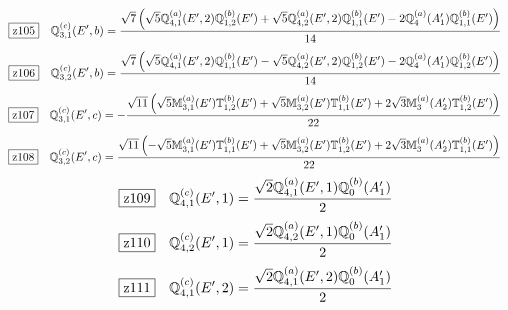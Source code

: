 \documentclass[fleqn,10pt,landscape]{jsarticle}
\begin{document}
\begin{dmath*}
\hspace*{3mm}\fbox{z105}\quad \mathbb{Q}_{3,1}^{(c)}(E^{\prime},b)=\frac{\sqrt{7} \left(\sqrt{5} \mathbb{Q}_{4,1}^{(a)}(E^{\prime},2) \mathbb{Q}_{1,2}^{(b)}(E^{\prime}) + \sqrt{5} \mathbb{Q}_{4,2}^{(a)}(E^{\prime},2) \mathbb{Q}_{1,1}^{(b)}(E^{\prime}) - 2 \mathbb{Q}_{4}^{(a)}(A_{1}^{\prime}) \mathbb{Q}_{1,1}^{(b)}(E^{\prime})\right)}{14}
\end{dmath*}
\begin{dmath*}
\hspace*{3mm}\fbox{z106}\quad \mathbb{Q}_{3,2}^{(c)}(E^{\prime},b)=\frac{\sqrt{7} \left(\sqrt{5} \mathbb{Q}_{4,1}^{(a)}(E^{\prime},2) \mathbb{Q}_{1,1}^{(b)}(E^{\prime}) - \sqrt{5} \mathbb{Q}_{4,2}^{(a)}(E^{\prime},2) \mathbb{Q}_{1,2}^{(b)}(E^{\prime}) - 2 \mathbb{Q}_{4}^{(a)}(A_{1}^{\prime}) \mathbb{Q}_{1,2}^{(b)}(E^{\prime})\right)}{14}
\end{dmath*}
\begin{dmath*}
\hspace*{3mm}\fbox{z107}\quad \mathbb{Q}_{3,1}^{(c)}(E^{\prime},c)=- \frac{\sqrt{11} \left(\sqrt{5} \mathbb{M}_{3,1}^{(a)}(E^{\prime}) \mathbb{T}_{1,2}^{(b)}(E^{\prime}) + \sqrt{5} \mathbb{M}_{3,2}^{(a)}(E^{\prime}) \mathbb{T}_{1,1}^{(b)}(E^{\prime}) + 2 \sqrt{3} \mathbb{M}_{3}^{(a)}(A_{2}^{\prime}) \mathbb{T}_{1,2}^{(b)}(E^{\prime})\right)}{22}
\end{dmath*}
\begin{dmath*}
\hspace*{3mm}\fbox{z108}\quad \mathbb{Q}_{3,2}^{(c)}(E^{\prime},c)=\frac{\sqrt{11} \left(- \sqrt{5} \mathbb{M}_{3,1}^{(a)}(E^{\prime}) \mathbb{T}_{1,1}^{(b)}(E^{\prime}) + \sqrt{5} \mathbb{M}_{3,2}^{(a)}(E^{\prime}) \mathbb{T}_{1,2}^{(b)}(E^{\prime}) + 2 \sqrt{3} \mathbb{M}_{3}^{(a)}(A_{2}^{\prime}) \mathbb{T}_{1,1}^{(b)}(E^{\prime})\right)}{22}
\end{dmath*}
\begin{dmath*}
\hspace*{3mm}\fbox{z109}\quad \mathbb{Q}_{4,1}^{(c)}(E^{\prime},1)=\frac{\sqrt{2} \mathbb{Q}_{4,1}^{(a)}(E^{\prime},1) \mathbb{Q}_{0}^{(b)}(A_{1}^{\prime})}{2}
\end{dmath*}
\begin{dmath*}
\hspace*{3mm}\fbox{z110}\quad \mathbb{Q}_{4,2}^{(c)}(E^{\prime},1)=\frac{\sqrt{2} \mathbb{Q}_{4,2}^{(a)}(E^{\prime},1) \mathbb{Q}_{0}^{(b)}(A_{1}^{\prime})}{2}
\end{dmath*}
\begin{dmath*}
\hspace*{3mm}\fbox{z111}\quad \mathbb{Q}_{4,1}^{(c)}(E^{\prime},2)=\frac{\sqrt{2} \mathbb{Q}_{4,1}^{(a)}(E^{\prime},2) \mathbb{Q}_{0}^{(b)}(A_{1}^{\prime})}{2}
\end{dmath*}
\end{document}
